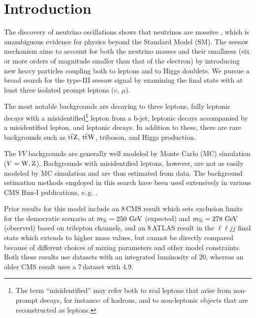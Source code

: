 \chapter{Introduction}
\label{sec:Introduction}


The discovery of neutrino oscillations shows that neutrinos are massive \cite{Nustatus}, which is unambiguous evidence for physics beyond the Standard Model (SM). The seesaw mechanism aims to account for both the neutrino masses and their smallness (six or more orders of magnitude smaller than that of the electron) by introducing new heavy particles coupling both to leptons and to Higgs doublets. We pursue a broad search for the type-III seesaw signal \cite{SeesawIII:a} by examining the final state with at least three isolated prompt leptons ($e$, $\mu$).

The most notable backgrounds are \WZ decaying to three leptons, fully leptonic \ttbar decays with a misidentified\footnote{The term ``misidentified'' may refer both to real leptons that arise from non-prompt decays, for instance: of hadrons, and to non-leptonic objects that are reconstructed as leptons.} lepton from a b-jet, leptonic \Z decays accompanied by a misidentified lepton, and leptonic \ZZ decays. In addition to these, there are rare backgrounds such as $\mathrm{t}\overline{\mathrm{t}}\mathrm{Z}$, $\mathrm{t}\overline{\mathrm{t}}\mathrm{W}$, triboson, and Higgs production.

The $VV$ backgrounds are generally well modeled by Monte Carlo (MC) simulation ($V = \mathrm{W}, \mathrm{Z}$). Backgrounds with misidentified leptons, however, are not as easily modeled by MC simulation and are thus estimated from data. The background estimation methods employed in this search have been used extensively in various CMS Run-I publications, e.\,g. \cite{Chatrchyan:2013xsw,Chatrchyan:2014aea,Khachatryan:2014mma,Khachatryan:2014jya}.

Prior results for this model include an 8\,\TeV CMS result \cite{CMS-PAS-EXO-14-001} which sets exclusion limits for the democratic scenario at $m_\Sigma = 250\,\,\text{Ge\hspace{-.08em}V}$ (expected) and $m_\Sigma = 278\,\,\text{Ge\hspace{-.08em}V}$ (observed) based on trilepton channels, and an 8\,\TeV ATLAS result in the $\ell\ell jj$ final state \cite{ATLAS-CERN-PH-EP-2015-094} which extends to higher mass values, but cannot be directly compared because of different choices of mixing parameters and other model constraints. Both these results use datasets with an integrated luminosity of 20\fbinv, whereas an older CMS result uses a 7\,\TeV dataset with 4.9\fbinv \cite{CMS-PAPER-EXO-11-073}.

